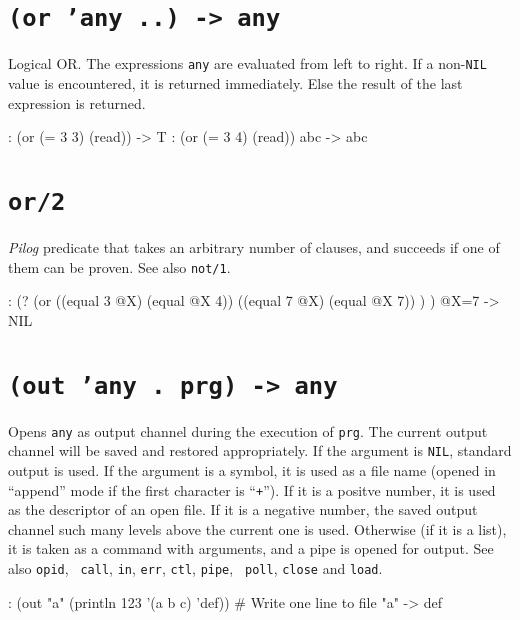 
 
\section*{\texttt{(or 'any ..) -> any}}
\label{sec:func-ref-O-(or 'any ..) -> any}


Logical OR. The expressions \texttt{any} are evaluated from left to right. If a
non-\texttt{NIL} value is encountered, it is returned immediately. Else the
result of the last expression is returned.


\begin{wideverbatim}
: (or (= 3 3) (read))
-> T
: (or (= 3 4) (read))
abc
-> abc
\end{wideverbatim}

 
\section*{\texttt{or/2}}
\label{sec:func-ref-O-or/2}


\emph{Pilog} predicate that takes an arbitrary number of
clauses, and succeeds if one of them can be proven. See also \texttt{not/1}.


\begin{wideverbatim}
: (?
   (or
      ((equal 3 @X) (equal @X 4))
      ((equal 7 @X) (equal @X 7)) ) )
 @X=7
-> NIL
\end{wideverbatim}

 
\section*{\texttt{(out 'any . prg) -> any}}
\label{sec:func-ref-O-(out 'any . prg) -> any}


Opens \texttt{any} as output channel during the execution of
\texttt{prg}. The current output channel will be saved and restored
appropriately. If the argument is \texttt{NIL}, standard output is
used. If the argument is a symbol, it is used as a file name (opened
in ``append'' mode if the first character is ``\texttt{+}''). If it is
a positve number, it is used as the descriptor of an open file. If it
is a negative number, the saved output channel such many levels above
the current one is used. Otherwise (if it is a list), it is taken as a
command with arguments, and a pipe is opened for output. See also
\texttt{opid}, \texttt{ call}, \texttt{in}, \texttt{err},
\texttt{ctl}, \texttt{pipe}, \texttt{ poll}, \texttt{close} and
\texttt{load}.


\begin{wideverbatim}
: (out "a" (println 123 '(a b c) 'def))  # Write one line to file "a"
-> def
\end{wideverbatim}




% 

